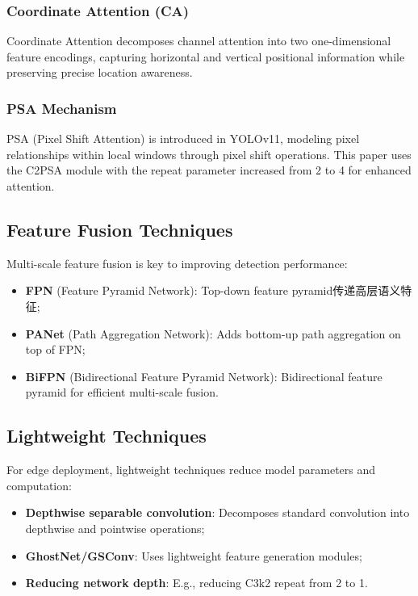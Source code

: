 \documentclass[12pt,a4paper]{article}
\begin{document}
\subsubsection{Coordinate Attention (CA)}
Coordinate Attention decomposes channel attention into two one-dimensional feature encodings, capturing horizontal and vertical positional information while preserving precise location awareness.

\subsubsection{PSA Mechanism}
PSA (Pixel Shift Attention) is introduced in YOLOv11, modeling pixel relationships within local windows through pixel shift operations. This paper uses the C2PSA module with the repeat parameter increased from 2 to 4 for enhanced attention.

\subsection{Feature Fusion Techniques}

Multi-scale feature fusion is key to improving detection performance:
\begin{itemize}[noitemsep]
  \item \textbf{FPN} (Feature Pyramid Network): Top-down feature pyramid传递高层语义特征;
  \item \textbf{PANet} (Path Aggregation Network): Adds bottom-up path aggregation on top of FPN;
  \item \textbf{BiFPN} (Bidirectional Feature Pyramid Network): Bidirectional feature pyramid for efficient multi-scale fusion.
\end{itemize}

\subsection{Lightweight Techniques}

For edge deployment, lightweight techniques reduce model parameters and computation:
\begin{itemize}[noitemsep]
  \item \textbf{Depthwise separable convolution}: Decomposes standard convolution into depthwise and pointwise operations;
  \item \textbf{GhostNet/GSConv}: Uses lightweight feature generation modules;
  \item \textbf{Reducing network depth}: E.g., reducing C3k2 repeat from 2 to 1.
\end{itemize}
\end{document}
